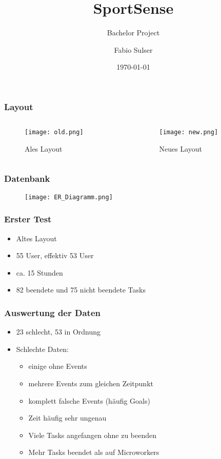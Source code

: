 \documentclass[]{beamer}
\title{SportSense}
\subtitle{Bachelor Project}
\author{Fabio Sulser}
\date{\today}
\begin{document}
\frame{\titlepage}

\begin{frame}
	\frametitle{Layout}
	\begin{columns}
	    \begin{column}{.5\linewidth}
	    		\begin{figure}[p]
	    			\centering
	    			\caption{Ales Layout}
				\texttt{[image: old.png]}
			\end{figure}
	    \end{column}
    		\begin{column}{.5\linewidth}
    			\begin{figure}[p]
    				\centering
    				\caption{Neues Layout}
				\texttt{[image: new.png]}
			\end{figure}
    		\end{column}
	\end{columns}
\end{frame}

\begin{frame}
	\frametitle{Datenbank}
		\begin{figure}
    			\centering
			\texttt{[image: ER\_Diagramm.png]}
		\end{figure}
\end{frame}

\begin{frame}
	\frametitle{Erster Test}
	\begin{itemize}
		\item Altes Layout
		\item 55 User, effektiv 53 User
		\item ca. 15 Stunden
		\item 82 beendete und 75 nicht beendete Tasks
	\end{itemize}
\end{frame}

\begin{frame}
	\frametitle{Auswertung der Daten}
	\begin{itemize}
		\item 23 schlecht, 53 in Ordnung
		\item Schlechte Daten:
		\begin{itemize}
			\item einige ohne Events
			\item mehrere Events zum gleichen Zeitpunkt
			\item komplett falsche Events (häufig Goals)
			\item Zeit häufig sehr ungenau
			\item Viele Tasks angefangen ohne zu beenden
			\item Mehr Tasks beendet als auf Microworkers
		\end{itemize}
	\end{itemize}
\end{frame}
\end{document}
